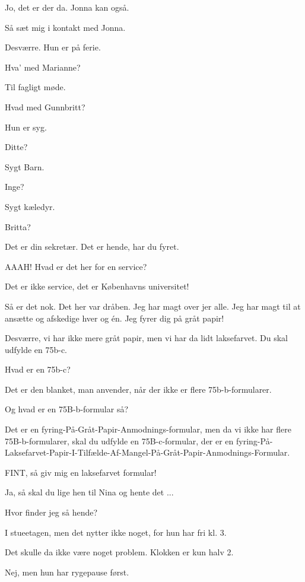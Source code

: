 \documentclass[a4paper,11pt]{article}
\begin{document}
\begin{sketch}
 Jo, det er der da. Jonna kan også.

 Så sæt mig i kontakt med Jonna.

 Desværre. Hun er på ferie.

 Hva' med Marianne?

 Til fagligt møde.

 Hvad med Gunnbritt?

 Hun er syg.

 Ditte?

 Sygt Barn.

 Inge?

 Sygt kæledyr.

 Britta?

 Det er din sekretær. Det er hende, har du fyret.

 AAAH! Hvad er det her for en service?

 Det er ikke service, det er Københavns universitet!

 Så er det nok. Det her var dråben. Jeg har magt over jer alle. Jeg 
har magt til at ansætte og afskedige hver og én. Jeg fyrer dig på gråt 
papir!

  Desværre, vi har ikke mere gråt papir, men vi har da 
lidt laksefarvet. Du skal udfylde en 75b-c.

 Hvad er en 75b-c?

 Det er den blanket, man anvender, når der ikke er flere 
75b-b-formularer.

 Og hvad er en 75B-b-formular så?

 Det er en fyring-På-Gråt-Papir-Anmodnings-formular, men da vi ikke har 
flere 75B-b-formularer, skal du udfylde en 75B-c-formular, der er en 
fyring-På-Laksefarvet-Papir-I-Tilfælde-Af-Mangel-På-Gråt-Papir-Anmodnings-Formular.

 FINT, så giv mig en laksefarvet formular!

 Ja, så skal du lige hen til Nina og hente det ...

 Hvor finder jeg så hende?

 I stueetagen, men det nytter ikke noget, for hun har fri kl. 3.

 Det skulle da ikke være noget problem. Klokken er kun halv 2.

 Nej, men hun har rygepause først.


\end{sketch}
\end{document}

